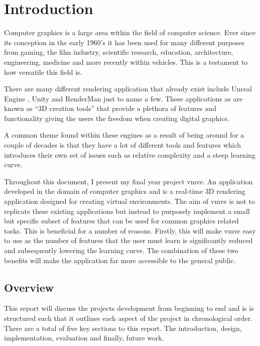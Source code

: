 \documentclass[11pt]{article}
\begin{document}
\pagebreak

\pagestyle{fancy}

\section{Introduction}

Computer graphics is a large area within the field of computer science. Ever
since its conception in the early 1960's it has been used for many different
purposes from gaming, the film industry, scientific research, education,
architecture, engineering, medicine and more recently within vehicles. This is a
testament to how versatile this field is.

There are many different rendering application that already exist include Unreal
Engine \cite{unreal_engine}, Unity \cite{unity} and RenderMan \cite{render_man}
just to name a few. These applications as are known as ``3D creation tools''
that provide a plethora of features and functionality giving the users the
freedom when creating digital graphics.

A common theme found within these engines as a result of being around for a
couple of decades is that they have a lot of different tools and features which
introduces their own set of issues such as  relative complexity and a steep
learning curve.

Throughout this document, I present my final year project \gls{vmve}. An
application developed in the domain of computer graphics and is a real-time 3D
rendering application designed for creating virtual environments. The aim of
\gls{vmve} is not to replicate these existing applications but instead to
purposely implement a small but specific subset of features that can be used for
common graphics related tasks. This is beneficial for a number of reasons.
Firstly, this will make \gls{vmve} easy to use as the number of features that
the user must learn is significantly reduced and subsequently lowering the
learning curve. The combination of these two benefits will make the application
far more accessible to the general public.


\subsection{Overview}
This report will discuss the projects development from beginning to end and is
is structured such that it outlines each aspect of the project in chronological
order. There are a total of five key sections to this report. The introduction,
design, implementation, evaluation and finally, future work.
\end{document}
